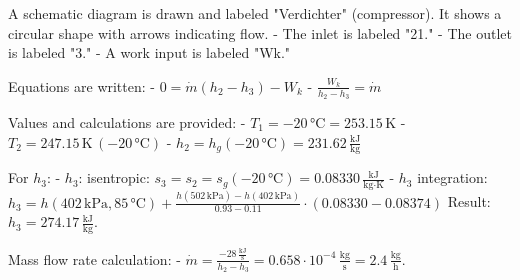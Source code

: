 A schematic diagram is drawn and labeled "Verdichter" (compressor). It shows a circular shape with arrows indicating flow.  
- The inlet is labeled "21."  
- The outlet is labeled "3."  
- A work input is labeled "Wk."  

Equations are written:  
- \( 0 = \dot{m}(h_2 - h_3) - W_k \)  
- \( \frac{W_k}{h_2 - h_3} = \dot{m} \)  

Values and calculations are provided:  
- \( T_1 = -20 \, \text{°C} = 253.15 \, \text{K} \)  
- \( T_2 = 247.15 \, \text{K} \, (-20 \, \text{°C}) \)  
- \( h_2 = h_g(-20 \, \text{°C}) = 231.62 \, \frac{\text{kJ}}{\text{kg}} \)  

For \( h_3 \):  
- \( h_3 \): isentropic: \( s_3 = s_2 = s_g(-20 \, \text{°C}) = 0.08330 \, \frac{\text{kJ}}{\text{kg·K}} \)  
- \( h_3 \) integration:  
  \( h_3 = h(402 \, \text{kPa}, 85 \, \text{°C}) + \frac{h(502 \, \text{kPa}) - h(402 \, \text{kPa})}{0.93 - 0.11} \cdot (0.08330 - 0.08374) \)  
  Result: \( h_3 = 274.17 \, \frac{\text{kJ}}{\text{kg}} \).  

Mass flow rate calculation:  
- \( \dot{m} = \frac{-28 \, \frac{\text{kJ}}{\text{s}}}{h_2 - h_3} = 0.658 \cdot 10^{-4} \, \frac{\text{kg}}{\text{s}} = 2.4 \, \frac{\text{kg}}{\text{h}} \).